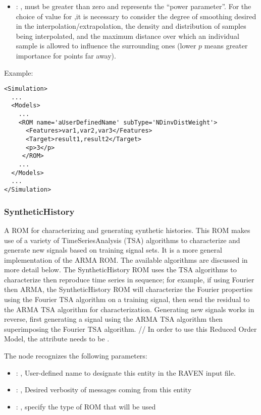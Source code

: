 \begin{itemize}
    \item {}: , 
      must be greater than zero and represents the ``power parameter''.
      For the choice of value for ,it is necessary to consider the degree
      of smoothing desired in the interpolation/extrapolation, the density and
      distribution of samples being interpolated, and the maximum distance over
      which an individual sample is allowed to influence the surrounding ones (lower
      $p$ means greater importance for points far away).
  \end{itemize}

\hspace{24pt}
Example:
\begin{lstlisting}[style=XML,morekeywords={name,subType}]
<Simulation>
  ...
  <Models>
    ...
    <ROM name='aUserDefinedName' subType='NDinvDistWeight'>
      <Features>var1,var2,var3</Features>
      <Target>result1,result2</Target>
      <p>3</p>
     </ROM>
    ...
  </Models>
  ...
</Simulation>
\end{lstlisting}


\subsubsection{SyntheticHistory}
  A ROM for characterizing and generating synthetic histories. This ROM makes use of         a
  variety of TimeSeriesAnalysis (TSA) algorithms to characterize and generate new         signals
  based on training signal sets. It is a more general implementation of the ARMA ROM. The available
  algorithms are discussed in more detail below. The SyntheticHistory ROM uses the TSA algorithms to
  characterize then reproduce time series in sequence; for example, if using Fourier then ARMA, the
  SyntheticHistory ROM will characterize the Fourier properties using the Fourier TSA algorithm on a
  training signal, then send the residual to the ARMA TSA algorithm for characterization. Generating
  new signals works in reverse, first generating a signal using the ARMA TSA algorithm then
  superimposing the Fourier TSA algorithm.         //         In order to use this Reduced Order
  Model, the  attribute          needs to be
  .

  The  node recognizes the following parameters:
    \begin{itemize}
      \item {}: , 
        User-defined name to designate this entity in the RAVEN input file.
      \item {}: , 
        Desired verbosity of messages coming from this entity
      \item {}: , 
        specify the type of ROM that will be used
  \end{itemize}

